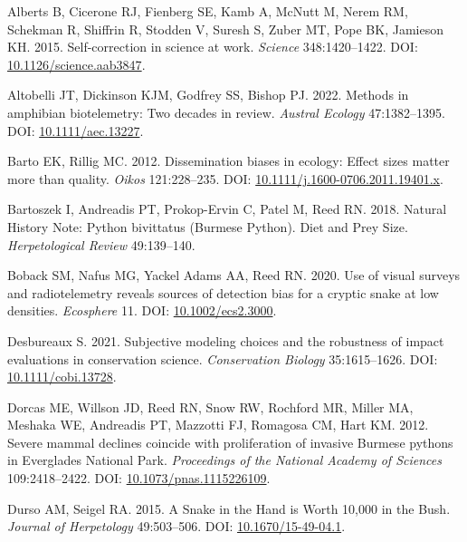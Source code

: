 \documentclass[10pt,a4paper]{article}
\newlength{\cslhangindent}
\newenvironment{CSLReferences}[2] %
 {\begin{list}{}{%
  \setlength{\itemindent}{0pt}
  \setlength{\leftmargin}{0pt}
  \setlength{\parsep}{0pt}
  \ifodd #1
   \setlength{\leftmargin}{\cslhangindent}
   \setlength{\itemindent}{-1\cslhangindent}
  \fi
  \setlength{\itemsep}{#2\baselineskip}}}
 {\end{list}}
\begin{document}
\label{refs}
\begin{CSLReferences}{1}{0}
Alberts B, Cicerone RJ, Fienberg SE, Kamb A, McNutt M, Nerem RM, Schekman R, Shiffrin R, Stodden V, Suresh S, Zuber MT, Pope BK, Jamieson KH. 2015. Self-correction in science at work. \emph{Science} 348:1420--1422. DOI: \href{https://doi.org/10.1126/science.aab3847}{10.1126/science.aab3847}.

Altobelli JT, Dickinson KJM, Godfrey SS, Bishop PJ. 2022. Methods in amphibian biotelemetry: {Two} decades in review. \emph{Austral Ecology} 47:1382--1395. DOI: \href{https://doi.org/10.1111/aec.13227}{10.1111/aec.13227}.

Barto EK, Rillig MC. 2012. Dissemination biases in ecology: Effect sizes matter more than quality. \emph{Oikos} 121:228--235. DOI: \href{https://doi.org/10.1111/j.1600-0706.2011.19401.x}{10.1111/j.1600-0706.2011.19401.x}.

Bartoszek I, Andreadis PT, Prokop-Ervin C, Patel M, Reed RN. 2018. Natural {History} {Note}: {Python} bivittatus ({Burmese} {Python}). {Diet} and {Prey} {Size}. \emph{Herpetological Review} 49:139--140.

Boback SM, Nafus MG, Yackel Adams AA, Reed RN. 2020. Use of visual surveys and radiotelemetry reveals sources of detection bias for a cryptic snake at low densities. \emph{Ecosphere} 11. DOI: \href{https://doi.org/10.1002/ecs2.3000}{10.1002/ecs2.3000}.

Desbureaux S. 2021. Subjective modeling choices and the robustness of impact evaluations in conservation science. \emph{Conservation Biology} 35:1615--1626. DOI: \href{https://doi.org/10.1111/cobi.13728}{10.1111/cobi.13728}.

Dorcas ME, Willson JD, Reed RN, Snow RW, Rochford MR, Miller MA, Meshaka WE, Andreadis PT, Mazzotti FJ, Romagosa CM, Hart KM. 2012. Severe mammal declines coincide with proliferation of invasive {Burmese} pythons in {Everglades} {National} {Park}. \emph{Proceedings of the National Academy of Sciences} 109:2418--2422. DOI: \href{https://doi.org/10.1073/pnas.1115226109}{10.1073/pnas.1115226109}.

Durso AM, Seigel RA. 2015. A {Snake} in the {Hand} is {Worth} 10,000 in the {Bush}. \emph{Journal of Herpetology} 49:503--506. DOI: \href{https://doi.org/10.1670/15-49-04.1}{10.1670/15-49-04.1}.


\end{CSLReferences}
\end{document}

